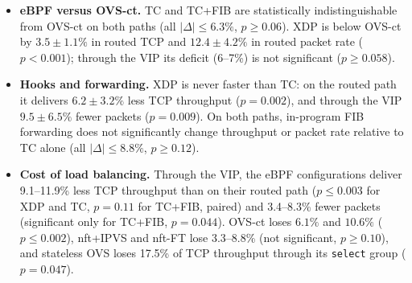 \documentclass[conference]{IEEEtran}
\begin{document}
\begin{itemize}
flowtable resolves an established flow, including its NAT binding and output
interface, with one lookup at the ingress hook and then skips routing,
connection tracking and the forward chain, whereas the eBPF pipeline still
evaluates the firewall, connection, NAT and telemetry tables for every
packet. The advantage of TC+FIB over nft+IPVS therefore comes mostly from
bypassing the forwarding path, which the kernel can also do: the flowtable
raises nftables' own throughput by $48.2 \pm 13.8\%$ over nft+IPVS.
\item \textbf{eBPF versus OVS-ct.} TC and TC+FIB are statistically
indistinguishable from OVS-ct on both paths (all $|\Delta| \le 6.3\%$,
$p \ge 0.06$). XDP is below OVS-ct by $3.5 \pm 1.1\%$ in routed TCP and
$12.4 \pm 4.2\%$ in routed packet rate ($p<0.001$); through the VIP its
deficit (6--7\%) is not significant ($p \ge 0.058$).
\item \textbf{Hooks and forwarding.} XDP is never faster than TC: on the
routed path it delivers $6.2 \pm 3.2\%$ less TCP throughput ($p=0.002$), and
through the VIP $9.5 \pm 6.5\%$ fewer packets ($p=0.009$). On both paths,
in-program FIB forwarding does not significantly change throughput or packet
rate relative to TC alone (all $|\Delta| \le 8.8\%$, $p \ge 0.12$).
\item \textbf{Cost of load balancing.} Through the VIP, the eBPF
configurations deliver 9.1--11.9\% less TCP throughput than on their routed
path ($p \le 0.003$ for XDP and TC, $p=0.11$ for TC+FIB, paired) and
3.4--8.3\% fewer packets (significant only for TC+FIB, $p=0.044$). OVS-ct
loses $6.1\%$ and $10.6\%$ ($p \le 0.002$), nft+IPVS and nft-FT lose
3.3--8.8\% (not significant, $p \ge 0.10$), and stateless OVS loses 17.5\% of
TCP throughput through its \texttt{select} group ($p=0.047$).
\end{itemize}
\end{document}
